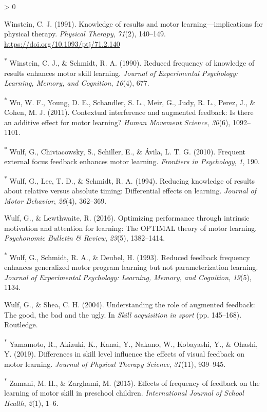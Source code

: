 \documentclass[
  english,
  man, donotrepeattitle,mask,floatsintext]{apa7}
\newlength{\cslhangindent}
\newenvironment{CSLReferences}[2] %
 {%
  \setlength{\parindent}{0pt}
  \ifodd #1 \everypar{\setlength{\hangindent}{\cslhangindent}}\ignorespaces\fi
  \ifnum #2 > 0
  \setlength{\parskip}{#2\baselineskip}
  \fi
 }%
 {}
\begin{document}
\begin{CSLReferences}{1}{0}
\leavevmode\hypertarget{ref-Winstein1991}{}%
Winstein, C. J. (1991). Knowledge of results and motor learning---implications for physical therapy. \emph{Physical Therapy}, \emph{71}(2), 140--149. \url{https://doi.org/10.1093/ptj/71.2.140}

\leavevmode\hypertarget{ref-Winstein1990}{}%
\textsuperscript{*} Winstein, C. J., \& Schmidt, R. A. (1990). Reduced frequency of knowledge of results enhances motor skill learning. \emph{Journal of Experimental Psychology: Learning, Memory, and Cognition}, \emph{16}(4), 677.

\leavevmode\hypertarget{ref-Wu2011}{}%
\textsuperscript{*} Wu, W. F., Young, D. E., Schandler, S. L., Meir, G., Judy, R. L., Perez, J., \& Cohen, M. J. (2011). Contextual interference and augmented feedback: Is there an additive effect for motor learning? \emph{Human Movement Science}, \emph{30}(6), 1092--1101.

\leavevmode\hypertarget{ref-Wulf2010}{}%
\textsuperscript{*} Wulf, G., Chiviacowsky, S., Schiller, E., \& Ávila, L. T. G. (2010). Frequent external focus feedback enhances motor learning. \emph{Frontiers in Psychology}, \emph{1}, 190.

\leavevmode\hypertarget{ref-Wulf1994}{}%
\textsuperscript{*} Wulf, G., Lee, T. D., \& Schmidt, R. A. (1994). Reducing knowledge of results about relative versus absolute timing: Differential effects on learning. \emph{Journal of Motor Behavior}, \emph{26}(4), 362--369.

\leavevmode\hypertarget{ref-Wulf2016}{}%
Wulf, G., \& Lewthwaite, R. (2016). Optimizing performance through intrinsic motivation and attention for learning: The OPTIMAL theory of motor learning. \emph{Psychonomic Bulletin \& Review}, \emph{23}(5), 1382--1414.

\leavevmode\hypertarget{ref-Wulf1993}{}%
\textsuperscript{*} Wulf, G., Schmidt, R. A., \& Deubel, H. (1993). Reduced feedback frequency enhances generalized motor program learning but not parameterization learning. \emph{Journal of Experimental Psychology: Learning, Memory, and Cognition}, \emph{19}(5), 1134.

\leavevmode\hypertarget{ref-Wulf2004}{}%
Wulf, G., \& Shea, C. H. (2004). Understanding the role of augmented feedback: The good, the bad and the ugly. In \emph{Skill acquisition in sport} (pp. 145--168). Routledge.

\leavevmode\hypertarget{ref-Yamamoto2019}{}%
\textsuperscript{*} Yamamoto, R., Akizuki, K., Kanai, Y., Nakano, W., Kobayashi, Y., \& Ohashi, Y. (2019). Differences in skill level influence the effects of visual feedback on motor learning. \emph{Journal of Physical Therapy Science}, \emph{31}(11), 939--945.

\leavevmode\hypertarget{ref-Zamani2015}{}%
\textsuperscript{*} Zamani, M. H., \& Zarghami, M. (2015). Effects of frequency of feedback on the learning of motor skill in preschool children. \emph{International Journal of School Health}, \emph{2}(1), 1--6.

\end{CSLReferences}
\end{document}
